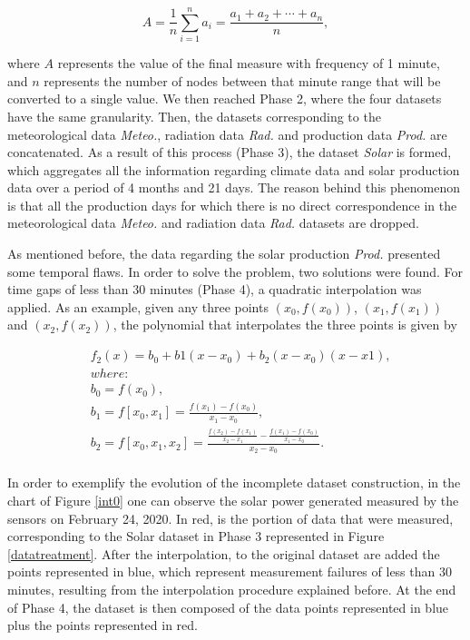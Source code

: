 \begin{equation}
     A={\frac {1}{n}}\sum _{i=1}^{n}a_{i}={\frac {a_{1}+a_{2}+\cdots +a_{n}}{n}},
\label{amean}
\end{equation}

where $A$ represents the value of the final measure with frequency of 1 minute, and $n$ represents the number of nodes between that minute range that will be converted to a single value. We then reached Phase 2, where the four datasets have the same granularity. Then, the datasets corresponding to the meteorological data \textit{Meteo.}, radiation data \textit{Rad.} and production data \textit{Prod.} are concatenated. As a result of this process (Phase 3), the dataset \textit{Solar} is formed, which aggregates all the information regarding climate data and solar production data over a period of 4 months and 21 days. The reason behind this phenomenon is that all the production days for which there is no direct correspondence in the meteorological data \textit{Meteo.} and radiation data \textit{Rad.} datasets are dropped. 

As mentioned before, the data regarding the solar production \textit{Prod.} presented some temporal flaws. In order to solve the problem, two solutions were found. For time gaps of less than 30 minutes (Phase 4), a quadratic interpolation was applied. As an example, given any three points $(x_0, f(x_0))$, $(x_1, f(x_1))$ and $(x_2, f(x_2))$, the polynomial that interpolates the three points is given by

\begin{equation}
\begin{split}
     & f_2(x)=b_0+b1(x-x_0)+b_2(x-x_0)(x-x1),\\
     & where:\\
     & b_0=f(x_0),\\
     & b_1=f[x_0,x_1]=\frac{f(x_1)-f(x_0)}{x_1-x_0},\\
     & b_2=f[x_0,x_1,x_2]=\frac{\frac{f(x_2)-f(x_1)}{x_2-x_1}-\frac{f(x_1)-f(x_0)}{x_1-x_0}}{x_2-x_0}.\\
\end{split}
\label{poly}
\end{equation}


In order to exemplify the evolution of the incomplete dataset construction, in the chart of Figure \ref{int0} one can observe the solar power generated measured by the sensors on February 24, 2020. In red, is the portion of data that were measured, corresponding to the Solar dataset in Phase 3 represented in Figure \ref{datatreatment}. After the interpolation, to the original dataset are added the points represented in blue, which represent measurement failures of less than 30 minutes, resulting from the interpolation procedure explained before. At the end of Phase 4, the dataset is then composed of the data points represented in blue plus the points represented in red.



